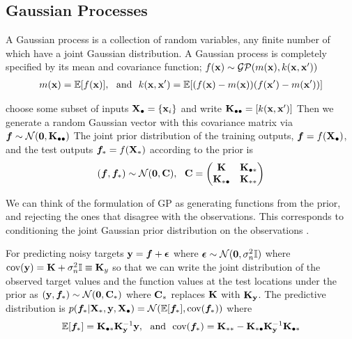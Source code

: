 \documentclass{article}
\begin{document}
\subsection{Gaussian Processes}
A Gaussian process is a collection of random variables, any finite number of which have a joint Gaussian distribution.
A Gaussian process is completely specified by its mean and covariance function; $f( \mathbf{x} ) \sim  \mathcal{G}\mathcal{P} (m( \mathbf{x} ) , k( \mathbf{x}  ,  \mathbf{x} ') ) $ 
\begin{align}
    m( \mathbf{x} ) =\mathbb{E}[f( \mathbf{x} )], \ \text{ and } \ k( \mathbf{x}  ,  \mathbf{x} ') = \mathbb{E}[(f( \mathbf{x} )-m( \mathbf{x} ))(f( \mathbf{x} ')-m( \mathbf{x} '))]
\end{align}

choose some subset of inputs $ \mathbf{X}  _\bullet =\{ \mathbf{x} _i \}$ 
and write $ \mathbf{K}  _{\bullet\bullet}= [k( \mathbf{x}   , \mathbf{x} ' )]$
Then we generate a random Gaussian vector with this covariance matrix via 
$\bm f  \sim \mathcal{N} ( \mathbf{0} ,  \mathbf{K} _{\bullet\bullet})$
The joint prior distribution of the training outputs, 
$\bm f= f( \mathbf{X} _\bullet)$, and the test outputs $\bm f_*=f ( \mathbf{X} _*)$ 
according to the prior is
\[( \bm f , \bm f _* ) \sim \mathcal{N} ( \mathbf{0} ,  \mathbf{C} ), \ \   \mathbf{C}  =\begin{pmatrix}  \mathbf{K}  &  \mathbf{K} _{\bullet *} \\  \mathbf{K} _{*\bullet} &  \mathbf{K} _{**} \end{pmatrix} \]

We can think of the formulation of GP as  generating functions
from the prior, and rejecting the ones that disagree with the observations. 
This corresponds to conditioning
the joint Gaussian prior distribution on the observations .

For predicting noisy targets $ \mathbf{y}  = \bm f + \bm \epsilon $ 
where $\bm \epsilon \sim \mathcal{N} ( \mathbf{0}  , \sigma^2 _n \mathbb{I}) $ 
where $\text{cov}( \mathbf{y}  ) =  \mathbf{K}  +\sigma^2 _n \mathbb{I} \equiv  \mathbf{K} _y$ so that 
we can write the joint distribution of 
the observed target values and the function values 
at the test locations under the prior as 
$ ( \mathbf{y}  , \bm f_*) \sim \mathcal{N} ( \mathbf{0} ,  \mathbf{C} _*) $ where $ \mathbf{C} _*$ replaces $ \mathbf{K}  $ with $ \mathbf{K} _{ \mathbf{y} }$. 
The predictive distribution is 
$p(\bm f_* |  \mathbf{X} _* ,  \mathbf{y} ,  \mathbf{X} _\bullet ) =\mathcal{N} (\mathbb{E} [\bm f_* ], \text{cov} (\bm f_*))$ where
\begin{align*}
\mathbb{E} [\bm f_* ] =   \mathbf{K} _{\bullet *}  \mathbf{K} _{ \mathbf{y} } ^{-1}  \mathbf{y}   , 
\ \text{ and } \  
\text{cov} (\bm f_*) =   \mathbf{K} _{**} - \mathbf{K} _{*\bullet }  \mathbf{K} _{ \mathbf{y} }^{-1} \mathbf{K} _{\bullet *}
\end{align*} 

\newpage
\end{document}
